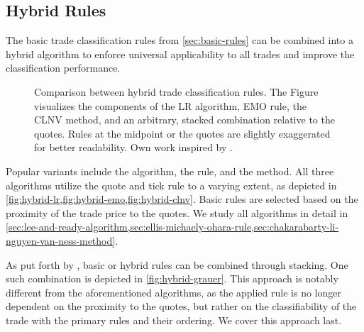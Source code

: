 \subsection{Hybrid Rules}\label{sec:hybrid-rules}

The basic trade classification rules from \cref{sec:basic-rules} can be combined into a hybrid algorithm to enforce universal applicability to all trades and improve the classification performance.


\begin{figure}[ht!]
    \hfill
    \hfill\null
    \caption[Comparison Between Hybrid Trade Classification Rules]{Comparison between hybrid trade classification rules. The Figure visualizes the components of the \acrshort{LR} algorithm, \acrshort{EMO} rule, the \acrshort{CLNV} method, and an arbitrary, stacked combination relative to the quotes. Rules at the midpoint or the quotes are slightly exaggerated for better readability. Own work inspired by \textcite[][167]{poppeSensitivityVPINChoice2016}.}
    \label{fig:hybrid-algorithms}
\end{figure}

Popular variants include the  algorithm, the  rule, and the  method. All three algorithms utilize the quote and tick rule to a varying extent, as depicted in \cref{fig:hybrid-lr,fig:hybrid-emo,fig:hybrid-clnv}. Basic rules are selected based on the proximity of the trade price to the quotes. We study all algorithms in detail in \cref{sec:lee-and-ready-algorithm,sec:ellis-michaely-ohara-rule,sec:chakarabarty-li-nguyen-van-ness-method}.


As put forth by \textcite[][18]{grauerOptionTradeClassification2022}, basic or hybrid rules can be combined through stacking. One such combination is depicted in \cref{fig:hybrid-grauer}. This approach is notably different from the aforementioned algorithms, as the applied rule is no longer dependent on the proximity to the quotes, but rather on the classifiability of the trade with the primary rules and their ordering. We cover this approach last.

